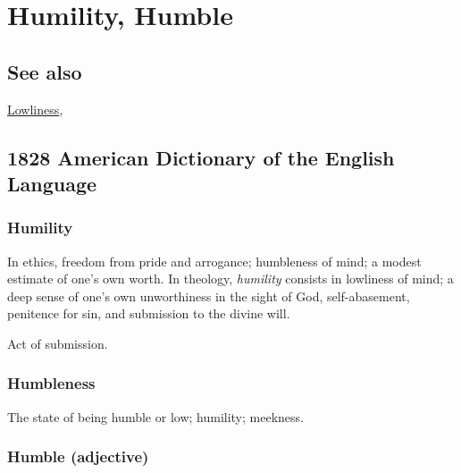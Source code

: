 \section{Humility, Humble}
	\label{HUMILITY}
	
\subsection{See also}

	\hyperref[LOWLINESS]{Lowliness},

\subsection{1828 American Dictionary of the English Language} %
	\label{HUMILITY-1828}
	
	\subsubsection{Humility}

		\begin{compactitem}
			\item[1] In ethics, freedom from pride and arrogance; humbleness of mind; a modest estimate of one's own worth. In theology, \textit{humility} consists in lowliness of mind; a deep sense of one's own unworthiness in the sight of God, self-abasement, penitence for sin, and submission to the divine will.
			\item[2] Act of submission.
		\end{compactitem}
		
	\subsubsection{Humbleness}

		\begin{compactitem}
			\item The state of being humble or low; humility; meekness.
		\end{compactitem}
		
	\subsubsection{Humble (adjective)}

